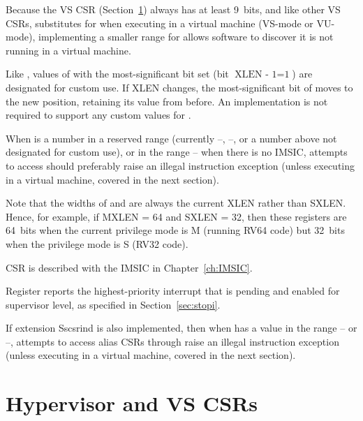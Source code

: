 \begin{commentary}
Because the VS CSR  (Section~\ref{ch:CSRs-hypervisor})
always has at least 9~bits, and like other VS CSRs, 
substitutes for  when executing in a virtual machine
(\mbox{VS-mode} or \mbox{VU-mode}), implementing a smaller range for
 allows software to discover it is not running in a virtual
machine.
\end{commentary}

Like , values of  with the most-significant bit
set (bit $\mbox{XLEN - 1} = \mbox{1}$) are designated for custom use.
If XLEN changes, the most-significant bit of  moves to
the new position, retaining its value from before.
An implementation is not required to support any custom values for
.

When  is a number in a reserved range (currently
--, --, or a number above 
not designated for custom use), or in the range --
when there is no IMSIC, attempts to access 
should preferably raise an illegal
instruction exception (unless executing in a virtual machine, covered
in the next section).

Note that the widths of  and 
are always the current XLEN rather than SXLEN\@.
Hence, for example, if MXLEN = 64 and SXLEN = 32, then these registers
are 64~bits when the current privilege mode is M (running RV64 code)
but 32~bits when the privilege mode is S (RV32 code).

CSR  is described with the IMSIC in Chapter~\ref{ch:IMSIC}.

Register  reports the highest-priority interrupt that
is pending and enabled for supervisor level, as specified in
Section~\ref{sec:stopi}.

If extension Sscsrind is also implemented, then when 
has a value in the range -- or --,
attempts to access alias CSRs  through 
raise an illegal instruction exception (unless executing
in a virtual machine, covered in the next section).

\section{Hypervisor and VS CSRs}
\label{ch:CSRs-hypervisor}

